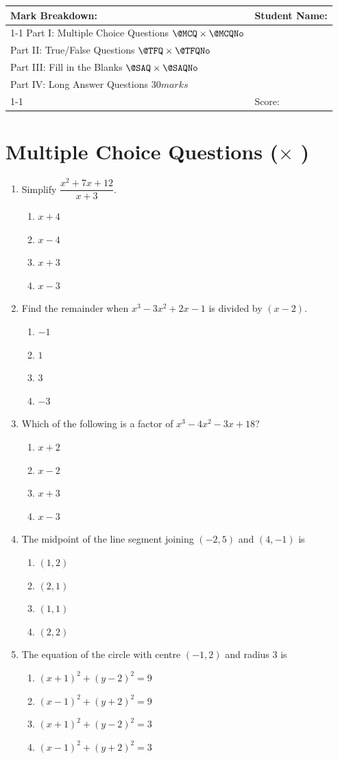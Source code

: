 \documentclass{sbs-exam}
\makeatletter
\def\makemarksheet{%
  \begin{center}
  \begin{tabular}{|p{0.5\textwidth}|p{0.35\textwidth}|}
    \hline
    \multicolumn{1}{|l|}{\bfseries Mark Breakdown:} & \multirow{3}{*}{Student Name:} \\
    \cline{1-1}
    Part I: Multiple Choice Questions $\@MCQ \times \@MCQNo$ & \\
    Part II: True/False Questions $\@TFQ \times \@TFQNo$ & \\
    Part III: Fill in the Blanks $\@SAQ \times \@SAQNo$ & \\
    Part IV: Long Answer Questions $\@LAQTotal$ & \\
    \cline{1-1}
    \multicolumn{1}{|l|}{Total Marks: \@TotalMarks} & Score: \fillline \\
    \hline
  \end{tabular}
  \end{center}
}
\def\@LAQTotal{30 marks}
\makeatother
\begin{document}
\makemarksheet

\examnotice

\examtools

\newpage

\makeatletter
\section*{Multiple Choice Questions (\@MCQ $\times$ \@MCQNo)}
\makeatother
\begin{enumerate}
    \item Simplify $\dfrac{x^2 + 7x + 12}{x+3}$.
    \begin{enumerate}
        \item $x+4$
        \item $x-4$
        \item $x+3$
        \item $x-3$
    \end{enumerate}

    \item Find the remainder when $x^3 - 3x^2 + 2x - 1$ is divided by $(x-2)$.
    \begin{enumerate}
        \item $-1$
        \item $1$
        \item $3$
        \item $-3$
    \end{enumerate}

    \item Which of the following is a factor of $x^3 - 4x^2 - 3x + 18$?
    \begin{enumerate}
        \item $x+2$
        \item $x-2$
        \item $x+3$
        \item $x-3$
    \end{enumerate}

    \item The midpoint of the line segment joining $(-2,5)$ and $(4,-1)$ is
    \begin{enumerate}
        \item $(1,2)$
        \item $(2,1)$
        \item $(1,1)$
        \item $(2,2)$
    \end{enumerate}

    \item The equation of the circle with centre $(-1,2)$ and radius $3$ is
    \begin{enumerate}
        \item $(x+1)^2 + (y-2)^2 = 9$
        \item $(x-1)^2 + (y+2)^2 = 9$
        \item $(x+1)^2 + (y-2)^2 = 3$
        \item $(x-1)^2 + (y+2)^2 = 3$
    \end{enumerate}


\end{enumerate}
\end{document}
